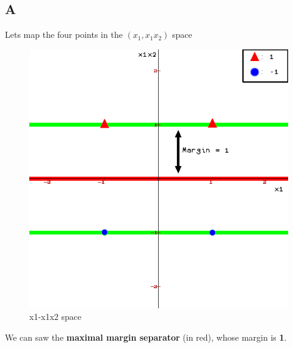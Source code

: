 \documentclass{article}
\begin{document}
        \subsection{A}
            Lets map the four points in the $(x_1, x_1x_2)$ space
            \begin{figure}[H]
                \centering
                \includegraphics[scale=0.5]{problem3/x1x2-x1.png}
                \caption{x1-x1x2 space}
            \end{figure}
            We can saw the \textbf{maximal margin separator} (in red), whose margin is \textbf{1}.\\
\end{document}
